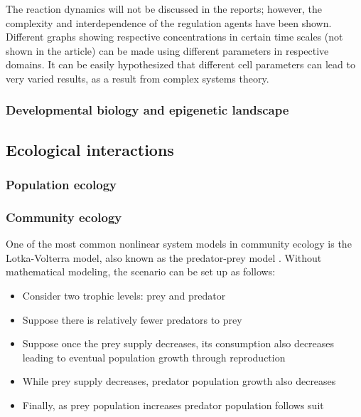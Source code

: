 The reaction dynamics will not be discussed in the reports; however, the complexity and interdependence of the regulation agents have been shown.
Different graphs showing respective concentrations in certain time scales (not shown in the article) can be made using different parameters in respective domains.
It can be easily hypothesized that different cell parameters can lead to very varied results, as a result from complex systems theory. %

\subsubsection{Developmental biology and epigenetic landscape}

\subsection{Ecological interactions}
\subsubsection{Population ecology}


\subsubsection{Community ecology}

One of the most common nonlinear system models in community ecology is the Lotka-Volterra model, also known as the predator-prey model \cite{Seibold2018}.
Without mathematical modeling, the scenario can be set up as follows:

\begin{itemize}
    \item Consider two trophic levels: prey and predator
    \item Suppose there is relatively fewer predators to prey
    \item Suppose once the prey supply decreases, its consumption also decreases
    leading to eventual population growth through reproduction
    \item While prey supply decreases, predator population growth also decreases
    \item Finally, as prey population increases predator population follows suit
\end{itemize}

